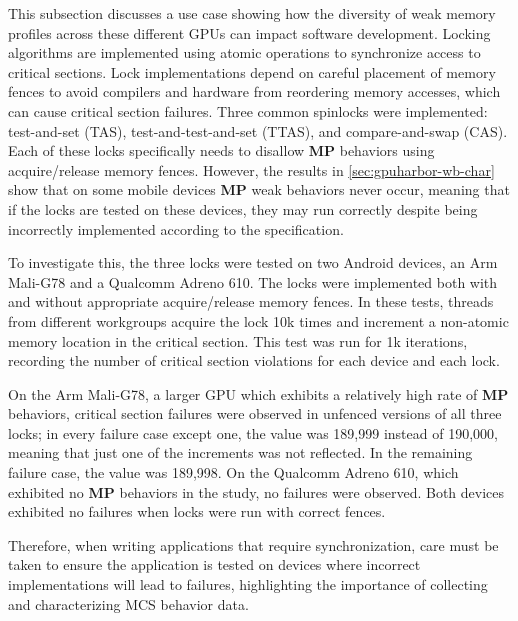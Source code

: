 This subsection discusses a use case showing how the diversity of weak memory profiles across these different GPUs can impact software development. Locking algorithms are implemented using atomic operations to synchronize access to critical sections. Lock implementations depend on careful placement of memory fences to avoid compilers and hardware from reordering memory accesses, which can cause critical section failures. Three common spinlocks were implemented: test-and-set (TAS), test-and-test-and-set (TTAS), and compare-and-swap (CAS). Each of these locks specifically needs to disallow \textbf{MP} behaviors using acquire/release memory fences. However, the results in \mysec\ref{sec:gpuharbor-wb-char} show that on some mobile devices \textbf{MP} weak behaviors never occur, meaning that if the locks are tested on these devices, they may run correctly despite being incorrectly implemented according to the specification.

To investigate this, the three locks were tested on two Android devices, an Arm Mali-G78 and a Qualcomm Adreno 610. The locks were implemented both with and without appropriate acquire/release memory fences. In these tests, threads from different workgroups acquire the lock 10k times and increment a non-atomic memory location in the critical section. This test was run for 1k iterations, recording the number of critical section violations for each device and each lock.

On the Arm Mali-G78, a larger GPU which exhibits a relatively high rate of \textbf{MP} behaviors, critical section failures were observed in unfenced versions of all three locks; in every failure case except one, the value was 189,999 instead of 190,000, meaning that just one of the increments was not reflected. In the remaining failure case, the value was 189,998. On the Qualcomm Adreno 610, which exhibited no \textbf{MP} behaviors in the study, no failures were observed. Both devices exhibited no failures when locks were run with correct fences.

Therefore, when writing applications that require synchronization, care must be taken to ensure the application is tested on devices where incorrect implementations will lead to failures, highlighting the importance of collecting and characterizing MCS behavior data.


